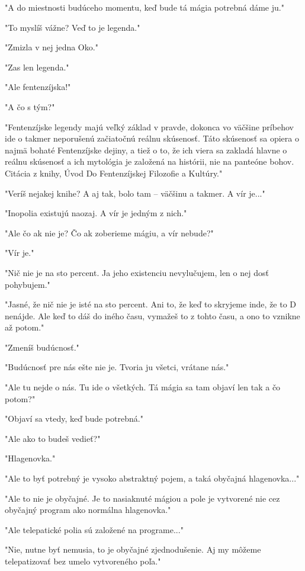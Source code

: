 \documentclass{book}
\begin{document}
"$ $A do miestnosti budúceho momentu, keď bude tá mágia potrebná dáme ju."$ $ 

"$ $To myslíš vážne? Veď to je legenda."$ $ 

"$ $Zmizla v nej jedna Oko."$ $ 

"$ $Zas len legenda."$ $ 

"$ $Ale fentenzíjska!"$ $ 

"$ $A čo s tým?"$ $ 

"$ $Fentenzíjske legendy majú veľký základ v pravde, dokonca vo väčšine príbehov ide o takmer neporušenú začiatočnú reálnu skúsenosť. Táto skúsenosť sa opiera o najmä bohaté Fentenzíjske dejiny, a tiež o to, že ich viera sa zakladá hlavne o reálnu skúsenosť a ich mytológia je založená na histórii, nie na panteóne bohov. Citácia z knihy, Úvod Do Fentenzíjskej Filozofie a Kultúry."$ $ 

"$ $Veríš nejakej knihe? A aj tak, bolo tam – väčšinu a takmer. A vír je..."$ $ 

"$ $Inopolia existujú naozaj. A vír je jedným z nich."$ $ 

"$ $Ale čo ak nie je? Čo ak zoberieme mágiu, a vír nebude?"$ $ 

"$ $Vír je."$ $ 

"$ $Nič nie je na sto percent. Ja jeho existenciu nevylučujem, len o nej dosť pohybujem."$ $ 

"$ $Jasné, že nič nie je isté na sto percent. Ani to, že keď to skryjeme inde, že to D nenájde. Ale keď to dáš do iného času, vymažeš to z tohto času, a ono to vznikne až potom."$ $ 

"$ $Zmeníš budúcnosť."$ $ 

"$ $Budúcnosť pre nás ešte nie je. Tvoria ju všetci, vrátane nás."$ $ 

"$ $Ale tu nejde o nás. Tu ide o všetkých. Tá mágia sa tam objaví len tak a čo potom?"$ $ 

"$ $Objaví sa vtedy, keď bude potrebná."$ $ 

"$ $Ale ako to budeš vedieť?"$ $ 

"$ $Hlagenovka."$ $ 

"$ $Ale to byť potrebný je vysoko abstraktný pojem, a taká obyčajná hlagenovka..."$ $ 

"$ $Ale to nie je obyčajné. Je to nasiaknuté mágiou a pole je vytvorené nie cez obyčajný program ako normálna hlagenovka."$ $ 

"$ $Ale telepatické polia sú založené na programe..."$ $ 

"$ $Nie, nutne byť nemusia, to je obyčajné zjednodušenie. Aj my môžeme telepatizovať bez umelo vytvoreného poľa."$ $ 
\end{document}
